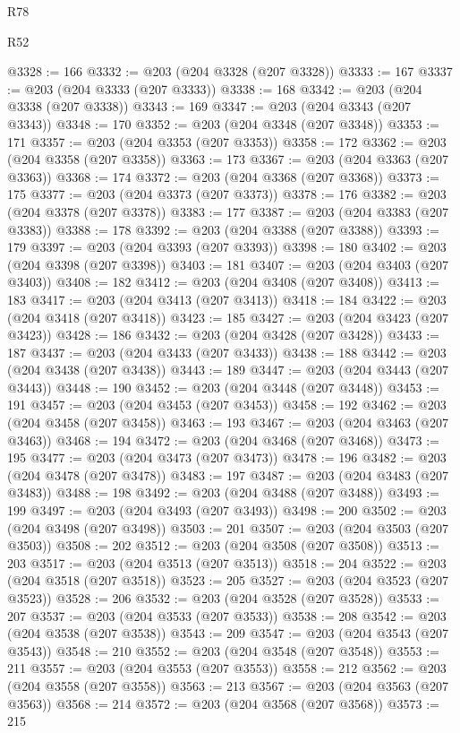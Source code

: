 \begin{lexlean}{R78}
\begin{lexlean}{R52}
\begin{coremodule}
{{{{{{{{{{{{{{{{{{{{{{{{{{{{{{{{{{{{{{{{{{{{{{{{{{{{{{{{{{{{{{{{{{{{{{{{{{{{{{{{{{{{{{{{{{{{{{{{{{{{{{{{{{{{{{{{{{{{{{{{{{{{{{{{{{{{{{{{{{{{{{{{{{{{{{{{{{{{{{{{{{{{{{{{{{{{{{{{{{{{{{{{{{{{{{{{{{{{{{@3328 := 166
@3332 := @203 (@204 @3328 (@207 @3328))
@3333 := 167
@3337 := @203 (@204 @3333 (@207 @3333))
@3338 := 168
@3342 := @203 (@204 @3338 (@207 @3338))
@3343 := 169
@3347 := @203 (@204 @3343 (@207 @3343))
@3348 := 170
@3352 := @203 (@204 @3348 (@207 @3348))
@3353 := 171
@3357 := @203 (@204 @3353 (@207 @3353))
@3358 := 172
@3362 := @203 (@204 @3358 (@207 @3358))
@3363 := 173
@3367 := @203 (@204 @3363 (@207 @3363))
@3368 := 174
@3372 := @203 (@204 @3368 (@207 @3368))
@3373 := 175
@3377 := @203 (@204 @3373 (@207 @3373))
@3378 := 176
@3382 := @203 (@204 @3378 (@207 @3378))
@3383 := 177
@3387 := @203 (@204 @3383 (@207 @3383))
@3388 := 178
@3392 := @203 (@204 @3388 (@207 @3388))
@3393 := 179
@3397 := @203 (@204 @3393 (@207 @3393))
@3398 := 180
@3402 := @203 (@204 @3398 (@207 @3398))
@3403 := 181
@3407 := @203 (@204 @3403 (@207 @3403))
@3408 := 182
@3412 := @203 (@204 @3408 (@207 @3408))
@3413 := 183
@3417 := @203 (@204 @3413 (@207 @3413))
@3418 := 184
@3422 := @203 (@204 @3418 (@207 @3418))
@3423 := 185
@3427 := @203 (@204 @3423 (@207 @3423))
@3428 := 186
@3432 := @203 (@204 @3428 (@207 @3428))
@3433 := 187
@3437 := @203 (@204 @3433 (@207 @3433))
@3438 := 188
@3442 := @203 (@204 @3438 (@207 @3438))
@3443 := 189
@3447 := @203 (@204 @3443 (@207 @3443))
@3448 := 190
@3452 := @203 (@204 @3448 (@207 @3448))
@3453 := 191
@3457 := @203 (@204 @3453 (@207 @3453))
@3458 := 192
@3462 := @203 (@204 @3458 (@207 @3458))
@3463 := 193
@3467 := @203 (@204 @3463 (@207 @3463))
@3468 := 194
@3472 := @203 (@204 @3468 (@207 @3468))
@3473 := 195
@3477 := @203 (@204 @3473 (@207 @3473))
@3478 := 196
@3482 := @203 (@204 @3478 (@207 @3478))
@3483 := 197
@3487 := @203 (@204 @3483 (@207 @3483))
@3488 := 198
@3492 := @203 (@204 @3488 (@207 @3488))
@3493 := 199
@3497 := @203 (@204 @3493 (@207 @3493))
@3498 := 200
@3502 := @203 (@204 @3498 (@207 @3498))
@3503 := 201
@3507 := @203 (@204 @3503 (@207 @3503))
@3508 := 202
@3512 := @203 (@204 @3508 (@207 @3508))
@3513 := 203
@3517 := @203 (@204 @3513 (@207 @3513))
@3518 := 204
@3522 := @203 (@204 @3518 (@207 @3518))
@3523 := 205
@3527 := @203 (@204 @3523 (@207 @3523))
@3528 := 206
@3532 := @203 (@204 @3528 (@207 @3528))
@3533 := 207
@3537 := @203 (@204 @3533 (@207 @3533))
@3538 := 208
@3542 := @203 (@204 @3538 (@207 @3538))
@3543 := 209
@3547 := @203 (@204 @3543 (@207 @3543))
@3548 := 210
@3552 := @203 (@204 @3548 (@207 @3548))
@3553 := 211
@3557 := @203 (@204 @3553 (@207 @3553))
@3558 := 212
@3562 := @203 (@204 @3558 (@207 @3558))
@3563 := 213
@3567 := @203 (@204 @3563 (@207 @3563))
@3568 := 214
@3572 := @203 (@204 @3568 (@207 @3568))
@3573 := 215
}}}}}}}}}}}}}}}}}}}}}}}}}}}}}}}}}}}}}}}}}}}}}}}}}}}}}}}}}}}}}}}}}}}}}}}}}}}}}}}}}}}}}}}}}}}}}}}}}}}}}}}}}}}}}}}}}}}}}}}}}}}}}}}}}}}}}}}}}}}}}}}}}}}}}}}}}}}}}}}}}}}}}}}}}}}}}}}}}}}}}}}}}}}}}}}}}}}}}}
\end{coremodule}
\end{lexlean}
\end{lexlean}
